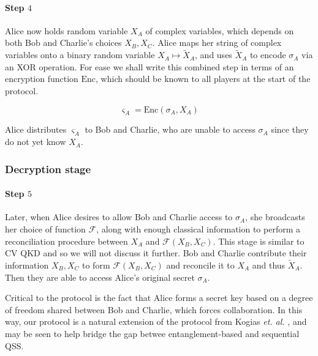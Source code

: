 
\paragraph{Step $4$} Alice now holds random variable $X_A$ of complex variables, which depends on both Bob and Charlie's choices $X_B, X_C$. Alice maps her string of complex variables onto a binary random variable $X_A \mapsto \tilde{X}_A$, and uses $\tilde{X}_A$ to encode $\sigma_A$ via an XOR operation. For ease we shall write this combined step in terms of an encryption function $\text{Enc}$, which should be known to all players at the start of the protocol. %

\begin{equation}
\varsigma_A = \text{Enc}\left(\sigma_A, X_A\right)
\end{equation}

\noindent Alice distributes $\varsigma_A$ to Bob and Charlie, who are unable to access $\sigma_A$ since they do not yet know $X_A$.

\subsubsection*{Decryption stage}

\paragraph{Step $5$} Later, when Alice desires to allow Bob and Charlie access to $\sigma_A$, she broadcasts her choice of function $\mathcal{F}$, along with enough classical information to perform a reconciliation procedure between $X_A$ and $\mathcal{F}\left(X_B, X_C\right)$. This stage is similar to CV QKD and so we will not discuss it further. Bob and Charlie contribute their information $X_B, X_C$ to form $\mathcal{F}\left(X_B, X_C\right)$ and reconcile it to $X_A$ and thus $\tilde{X}_A$. Then they are able to access Alice's original secret $\sigma_A$.

Critical to the protocol is the fact that Alice forms a secret key based on a degree of freedom shared between Bob and Charlie, which forces collaboration. In this way, our protocol is a natural extension of the protocol from Kogias \emph{et. al.} \cite{Kogias2017}, and may be seen to help bridge the gap betwee entanglement-based and sequential QSS.


